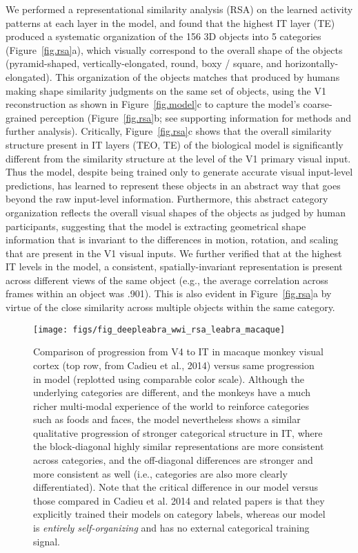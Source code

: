 \documentclass[11pt,twoside]{article}
\newif\myifpdf
\begin{document}
We performed a representational similarity analysis (RSA) on the learned activity patterns at each layer in the model, and found that the highest IT layer (TE) produced a systematic organization of the 156 3D objects into 5 categories (Figure~\ref{fig.rsa}a), which visually correspond to the overall shape of the objects (pyramid-shaped, vertically-elongated, round, boxy / square, and horizontally-elongated). This organization of the objects matches that produced by humans making shape similarity judgments on the same set of objects, using the V1 reconstruction as shown in Figure~\ref{fig.model}c to capture the model's coarse-grained perception (Figure~\ref{fig.rsa}b; see supporting information for methods and further analysis).  Critically, Figure~\ref{fig.rsa}c shows that the overall similarity structure present in IT layers (TEO, TE) of the biological model is significantly different from the similarity structure at the level of the V1 primary visual input.  Thus the model, despite being trained only to generate accurate visual input-level predictions, has learned to represent these objects in an abstract way that goes beyond the raw input-level information.  Furthermore, this abstract category organization reflects the overall visual shapes of the objects as judged by human participants, suggesting that the model is extracting geometrical shape information that is invariant to the differences in motion, rotation, and scaling that are present in the V1 visual inputs.  We further verified that at the highest IT levels in the model, a consistent, spatially-invariant representation is present across different views of the same object (e.g., the average correlation across frames within an object was .901).  This is also evident in Figure~\ref{fig.rsa}a by virtue of the close similarity across multiple objects within the same category.

\begin{figure}
  \centering\texttt{[image: figs/fig\_deepleabra\_wwi\_rsa\_leabra\_macaque]}
  \caption{Comparison of progression from V4 to IT in macaque monkey visual cortex (top row, from Cadieu et al., 2014) versus same progression in model (replotted using comparable color scale).  Although the underlying categories are different, and the monkeys have a much richer multi-modal experience of the world to reinforce categories such as foods and faces, the model nevertheless shows a similar qualitative progression of stronger categorical structure in IT, where the block-diagonal highly similar representations are more consistent across categories, and the off-diagonal differences are stronger and more consistent as well (i.e., categories are also more clearly differentiated).  Note that the critical difference in our model versus those compared in Cadieu et al. 2014 and related papers is that they explicitly trained their models on category labels, whereas our model is \emph{entirely self-organizing} and has no external categorical training signal.}
  \label{fig.macaque}
\end{figure}
\end{document}
